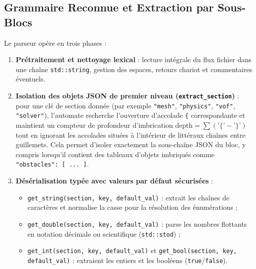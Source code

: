 \documentclass[10pt,a4paper,oneside]{book}
\begin{document}
\subsection{Grammaire Reconnue et Extraction par Sous-Blocs}
Le parseur opère en trois phases :
\begin{enumerate}
  \item \textbf{Prétraitement et nettoyage lexical} : lecture intégrale du flux fichier dans une chaîne \texttt{std::string}, gestion des espaces, retours chariot et commentaires éventuels.
  \item \textbf{Isolation des objets JSON de premier niveau (\texttt{extract\_section})} : pour une clé de section donnée (par exemple \texttt{"mesh"}, \texttt{"physics"}, \texttt{"vof"}, \texttt{"solver"}), l'automate recherche l'ouverture d'accolade \texttt{\{} correspondante et maintient un compteur de profondeur d'imbrication $\text{depth} = \sum (\texttt{'\{'} - \texttt{'\}'})$ tout en ignorant les accolades situées à l'intérieur de littéraux chaînes entre guillemets. Cela permet d'isoler exactement la sous-chaîne JSON du bloc, y compris lorsqu'il contient des tableaux d'objets imbriqués comme \texttt{"obstacles": [ ... ]}.
  \item \textbf{Désérialisation typée avec valeurs par défaut sécurisées} :
  \begin{itemize}
    \item \texttt{get\_string(section, key, default\_val)} : extrait les chaînes de caractères et normalise la casse pour la résolution des énumérations ;
    \item \texttt{get\_double(section, key, default\_val)} : parse les nombres flottants en notation décimale ou scientifique (\texttt{std::stod}) ;
    \item \texttt{get\_int(section, key, default\_val)} et \texttt{get\_bool(section, key, default\_val)} : extraient les entiers et les booléens (\texttt{true}/\texttt{false}).
  \end{itemize}
\end{enumerate}
\end{document}
